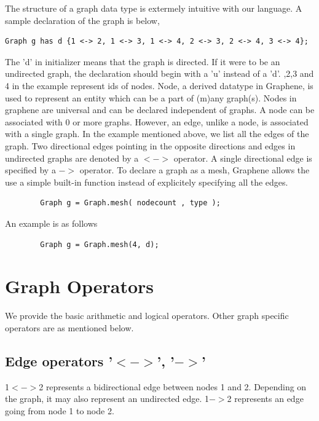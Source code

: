\documentclass[a4paper]{article}
\begin{document}
The structure of a graph data type is extermely intuitive with our language. A sample declaration of the graph is below, 
\begin{verbatim}
Graph g has d {1 <-> 2, 1 <-> 3, 1 <-> 4, 2 <-> 3, 2 <-> 4, 3 <-> 4};
\end{verbatim}
The 'd' in initializer means that the graph is directed. If it were to be an undirected graph, the declaration should begin with a 'u' instead of a 'd'.
,2,3 and 4 in the example represent ids of nodes. Node, a derived datatype in Graphene, is used to represent an entity which can be a part of (m)any graph(s). Nodes in graphene are universal and can be declared independent of graphs. A node can be associated with 0 or more graphs. However, an edge, unlike a node, is associated with a single graph. 
\newline
\newline
In the example mentioned above, we list all the edges of the graph. Two directional edges pointing in the opposite directions and edges in undirected graphs are denoted by a $<->$ operator. A single directional edge is specified by a $->$ operator.
\newline
\newline
To declare a graph as a mesh, Graphene allows the use a simple built-in function instead of explicitely specifying all the edges. 
\begin{verbatim}
		Graph g = Graph.mesh( nodecount , type );
\end{verbatim}

\noindent An example is as follows
\begin{verbatim}
		Graph g = Graph.mesh(4, d);
\end{verbatim}
\section{Graph Operators}

We provide the basic arithmetic and logical operators. Other graph specific operators are as mentioned below.

\subsection{Edge operators '$<->$', '$->$'}
    1$<->$2 represents a bidirectional edge between nodes 1 and 2. Depending on the graph, it may also represent an undirected edge. 1$->$2 represents an edge going from node 1 to node 2. 
\end{document}
